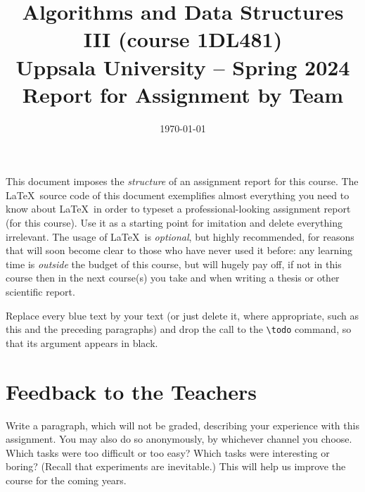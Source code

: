 \documentclass[a4paper,11pt,hidelinks]{article}
\title{\textbf{Algorithms and Data Structures III (course 1DL481) \\
    Uppsala University -- Spring 2024 \\
    Report for Assignment \todo{n}  %
    by Team \todo{t}}}              %
\author{\todo{Clara CLÄVER} \and \todo{Whiz KIDD}}
\date{\today}
\newcommand{\todo}[1]{{\color{blue}#1}}  %
\begin{document}
\maketitle

\todo{
  \noindent
  This document imposes the \emph{structure} of an assignment report
  for this course.  The \LaTeX\ source code of this document
  exemplifies almost everything you need to know about \LaTeX\ in
  order to typeset a professional-looking assignment report (for this
  course).  Use it as a starting point for imitation and delete
  everything irrelevant.  The usage of \LaTeX\ is \emph{optional}, but
  highly recommended, for reasons that will soon become clear to those
  who have never used it before: any learning time is \emph{outside}
  the budget of this course, but will hugely pay off, if not in this
  course then in the next course(s) you take and when writing a thesis
  or other scientific report. \medskip

  Replace every blue text by your text (or just delete it, where
  appropriate, such as this and the preceding paragraphs) and drop the
  call to the \texttt{\textbackslash{}todo} command, so that its
  argument appears in black.
  
}



\clearpage


\clearpage


\clearpage


\section*{Feedback to the Teachers}

\todo{Write a paragraph, which will not be graded, describing your
  experience with this assignment.  You may also do so anonymously, by
  whichever channel you choose.  Which tasks were too difficult or too
  easy?  Which tasks were interesting or boring?  (Recall that
  experiments are inevitable.)  This will help us improve the course
  for the coming years.}



\todo{}
\end{document}
